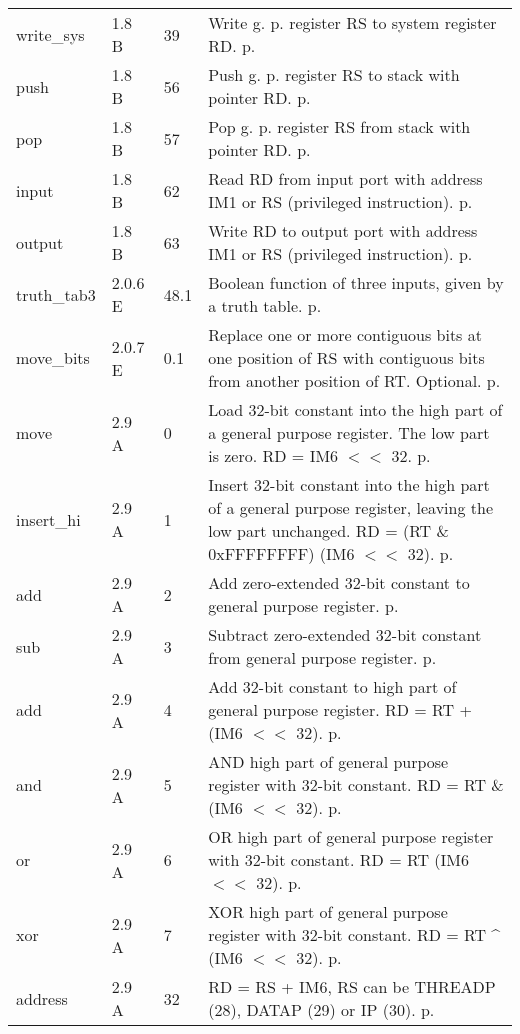 \documentclass[forwardcom.tex]{subfiles}
\begin{document}
\begin{longtable} {|p{25mm}|p{14mm}|p{10mm}|p{95mm}|}
write\_sys    & 1.8 B & 39  & Write g. p. register RS to system register RD. p. \pageref{table:readSysInstruction} \\
push          & 1.8 B & 56  & Push g. p. register RS to stack with pointer RD. p. \pageref{table:pushInstruction} \\
pop           & 1.8 B & 57  & Pop g. p. register RS from stack with pointer RD. p. \pageref{table:popInstruction} \\
input         & 1.8 B & 62  & Read RD from input port with address IM1 or RS (privileged instruction). p. \pageref{table:inputInstruction} \\
output        & 1.8 B & 63  & Write RD to output port with address IM1 or RS (privileged instruction). p. \pageref{table:outputInstruction} \\

truth\_tab3   & 2.0.6 E & 48.1 & Boolean function of three inputs, given by a truth table. p. \pageref{table:truthTab3Instruction} \\

move\_bits    & 2.0.7 E & 0.1 & Replace one or more contiguous bits at one position of RS with contiguous bits from another position of RT. Optional. p. \pageref{table:moveBitsInstruction} \\

move          & 2.9 A &  0  & Load 32-bit constant into the high part of a general purpose register. The low part is zero. RD = IM6 $<<$ 32. p. \pageref{table:moveInstruction} \\
insert\_hi    & 2.9 A &  1  & Insert 32-bit constant into the high part of a general purpose register, leaving the low part unchanged.
RD = (RT \& 0xFFFFFFFF) \textbar{} (IM6 $<<$ 32). p. \pageref{table:insertHiInstruction} \\
add           & 2.9 A &  2  & Add zero-extended 32-bit constant to general purpose register. p. \pageref{table:addInstruction} \\
sub           & 2.9 A &  3  & Subtract zero-extended 32-bit constant from general purpose register. p. \pageref{table:subInstruction} \\
add           & 2.9 A &  4  & Add 32-bit constant to high part of general purpose register. RD = RT + (IM6 $<<$ 32). p. \pageref{table:addInstruction} \\
and           & 2.9 A &  5  & AND high part of general purpose register with 32-bit constant. RD = RT \& (IM6 $<<$ 32). p. \pageref{table:andInstruction} \\
or            & 2.9 A &  6  & OR high part of general purpose register with 32-bit constant. RD = RT \textbar{} (IM6 $<<$ 32). p. \pageref{table:orInstruction} \\
xor           & 2.9 A &  7  & XOR high part of general purpose register with 32-bit constant. RD = RT \^{} (IM6 $<<$ 32). p. \pageref{table:xorInstruction} \\
address       & 2.9 A & 32  & RD = RS + IM6, RS can be THREADP (28), DATAP (29) or IP (30). p. \pageref{table:addressInstruction} \\
\hline
\end{longtable}
\end{document}

